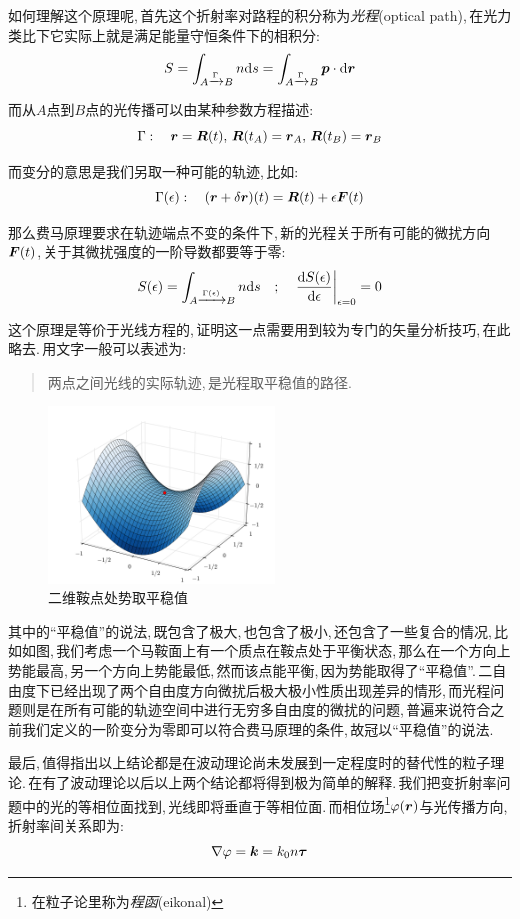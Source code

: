 如何理解这个原理呢,\,首先这个折射率对路程的积分称为\emph{光程}(optical path),\,在光力类比下它实际上就是满足能量守恒条件下的相积分:
\[S=\int_{A\xrightarrow{\Gamma} B} n\textrm{d} s=\int_{A\xrightarrow{\Gamma} B} \boldsymbol{p}\cdot\textrm{d} \boldsymbol{r}\]

而从\(A\)点到\(B\)点的光传播可以由某种参数方程描述:
\[\Gamma :\quad\boldsymbol{r}=\boldsymbol{R}(t),\,\boldsymbol{R}(t_A)=\boldsymbol{r}_A,\,\boldsymbol{R}(t_B)=\boldsymbol{r}_B\]

而变分的意思是我们另取一种可能的轨迹,\,比如:
\[\Gamma(\epsilon):\quad(\boldsymbol{r}+\delta\boldsymbol{r})(t)=\boldsymbol{R}(t)+\epsilon \boldsymbol{F}(t)\]

那么费马原理要求在轨迹端点不变的条件下,\,新的光程关于所有可能的微扰方向\(\boldsymbol{F}(t)\),\,关于其微扰强度的一阶导数都要等于零:
\[S(\epsilon)=\int_{A\xrightarrow{\Gamma(\epsilon)} B} n\textrm{d} s\quad ;\quad \left.\frac{\textrm{d} S(\epsilon)}{\textrm{d} \epsilon}\right|_{\epsilon=0}=0\]

这个原理是等价于光线方程的,\,证明这一点需要用到较为专门的矢量分析技巧,\,在此略去.\,用文字一般可以表述为:

\begin{quote}
两点之间光线的实际轨迹,\,是光程取平稳值的路径.
\end{quote}

\begin{figure}
\centering
\includegraphics[width=6cm]{image/5-6-11.png}
\caption{二维鞍点处势取平稳值}
\end{figure}
其中的``平稳值''的说法,\,既包含了极大,\,也包含了极小,\,还包含了一些复合的情况,\,比如如图,\,我们考虑一个马鞍面上有一个质点在鞍点处于平衡状态,\,那么在一个方向上势能最高,\,另一个方向上势能最低,\,然而该点能平衡,\,因为势能取得了``平稳值''.\,二自由度下已经出现了两个自由度方向微扰后极大极小性质出现差异的情形,\,而光程问题则是在所有可能的轨迹空间中进行无穷多自由度的微扰的问题,\,普遍来说符合之前我们定义的一阶变分为零即可以符合费马原理的条件,\,故冠以``平稳值''的说法.

最后,\,值得指出以上结论都是在波动理论尚未发展到一定程度时的替代性的粒子理论.\,在有了波动理论以后以上两个结论都将得到极为简单的解释.\,我们把变折射率问题中的光的等相位面找到,\,光线即将垂直于等相位面.\,而相位场\footnote{在粒子论里称为\emph{程函}(eikonal)}\(\varphi(\boldsymbol{r})\)与光传播方向,\,折射率间关系即为:
\[\nabla\varphi=\boldsymbol{k}=k_0 n\boldsymbol{\tau}\]

